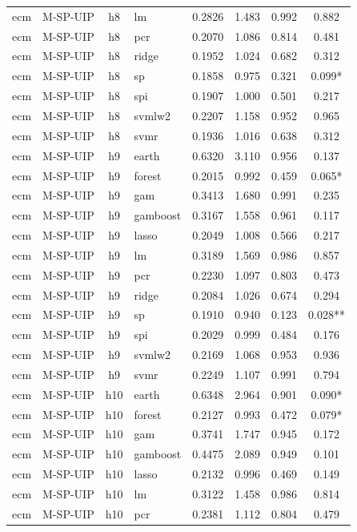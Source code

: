 \begin{ThreePartTable}
\begin{longtable}[t]{llclcccc}
ecm & M-SP-UIP & h8 & lm & 0.2826 & 1.483 & 0.992 & 0.882\\
ecm & M-SP-UIP & h8 & pcr & 0.2070 & 1.086 & 0.814 & 0.481\\
ecm & M-SP-UIP & h8 & ridge & 0.1952 & 1.024 & 0.682 & 0.312\\
ecm & M-SP-UIP & h8 & sp & 0.1858 & 0.975 & 0.321 & 0.099*\\
ecm & M-SP-UIP & h8 & spi & 0.1907 & 1.000 & 0.501 & 0.217\\
ecm & M-SP-UIP & h8 & svmlw2 & 0.2207 & 1.158 & 0.952 & 0.965\\
ecm & M-SP-UIP & h8 & svmr & 0.1936 & 1.016 & 0.638 & 0.312\\
\addlinespace
ecm & M-SP-UIP & h9 & earth & 0.6320 & 3.110 & 0.956 & 0.137\\
ecm & M-SP-UIP & h9 & forest & 0.2015 & 0.992 & 0.459 & 0.065*\\
ecm & M-SP-UIP & h9 & gam & 0.3413 & 1.680 & 0.991 & 0.235\\
ecm & M-SP-UIP & h9 & gamboost & 0.3167 & 1.558 & 0.961 & 0.117\\
ecm & M-SP-UIP & h9 & lasso & 0.2049 & 1.008 & 0.566 & 0.217\\
ecm & M-SP-UIP & h9 & lm & 0.3189 & 1.569 & 0.986 & 0.857\\
ecm & M-SP-UIP & h9 & pcr & 0.2230 & 1.097 & 0.803 & 0.473\\
ecm & M-SP-UIP & h9 & ridge & 0.2084 & 1.026 & 0.674 & 0.294\\
ecm & M-SP-UIP & h9 & sp & 0.1910 & 0.940 & 0.123 & 0.028**\\
ecm & M-SP-UIP & h9 & spi & 0.2029 & 0.999 & 0.484 & 0.176\\
ecm & M-SP-UIP & h9 & svmlw2 & 0.2169 & 1.068 & 0.953 & 0.936\\
ecm & M-SP-UIP & h9 & svmr & 0.2249 & 1.107 & 0.991 & 0.794\\
\addlinespace
ecm & M-SP-UIP & h10 & earth & 0.6348 & 2.964 & 0.901 & 0.090*\\
ecm & M-SP-UIP & h10 & forest & 0.2127 & 0.993 & 0.472 & 0.079*\\
ecm & M-SP-UIP & h10 & gam & 0.3741 & 1.747 & 0.945 & 0.172\\
ecm & M-SP-UIP & h10 & gamboost & 0.4475 & 2.089 & 0.949 & 0.101\\
ecm & M-SP-UIP & h10 & lasso & 0.2132 & 0.996 & 0.469 & 0.149\\
ecm & M-SP-UIP & h10 & lm & 0.3122 & 1.458 & 0.986 & 0.814\\
ecm & M-SP-UIP & h10 & pcr & 0.2381 & 1.112 & 0.804 & 0.479\\

\end{longtable}
\end{ThreePartTable}
